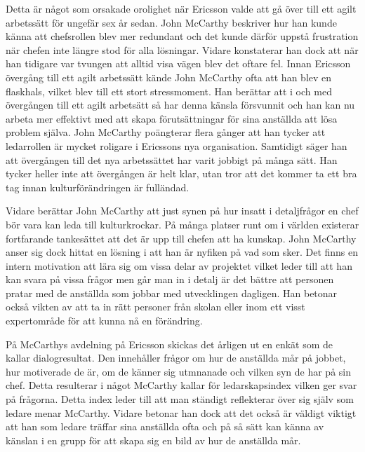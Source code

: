 Detta är något som orsakade orolighet när Ericsson valde att gå över till ett agilt arbetssätt för ungefär sex år sedan. John McCarthy beskriver hur han kunde känna att chefsrollen blev mer redundant och det kunde därför uppstå frustration när chefen inte längre stod för alla lösningar. Vidare konstaterar han dock att när han tidigare var tvungen att alltid visa vägen blev det oftare fel. Innan Ericsson övergång till ett agilt arbetssätt kände John McCarthy ofta att han blev en flaskhals, vilket blev till ett stort stressmoment. Han berättar att i och med övergången till ett agilt arbetsätt så har denna känsla försvunnit och han kan nu arbeta mer effektivt med att skapa förutsättningar för sina anställda att lösa problem själva. John McCarthy poängterar flera gånger att han tycker att ledarrollen är mycket roligare i Ericssons nya organisation. Samtidigt säger han att övergången till det nya arbetssättet har varit jobbigt på många sätt. Han tycker heller inte att övergången är helt klar, utan tror att det kommer ta ett bra tag innan kulturförändringen är fulländad.

Vidare berättar John McCarthy att just synen på hur insatt i detaljfrågor en chef bör vara kan leda till kulturkrockar. På många platser runt om i världen existerar fortfarande tankesättet att det är upp till chefen att ha kunskap. John McCarthy anser sig dock hittat en lösning i att han är nyfiken på vad som sker. Det finns en intern motivation att lära sig om vissa delar av projektet vilket leder till att han kan svara på vissa frågor men går man in i detalj är det bättre att personen pratar med de anställda som jobbar med utvecklingen dagligen. Han betonar också vikten av att ta in rätt personer från skolan eller inom ett visst expertområde för att kunna nå en förändring.

På McCarthys avdelning på Ericsson skickas det årligen ut en enkät som de kallar dialogresultat. Den innehåller frågor om hur de anställda mår på jobbet, hur motiverade de är, om de känner sig utmnanade och vilken syn de har på sin chef. Detta resulterar i något McCarthy kallar för ledarskapsindex vilken ger svar på frågorna. Detta index leder till att man ständigt reflekterar över sig själv som ledare menar McCarthy. Vidare betonar han dock att det också är väldigt viktigt att han som ledare träffar sina anställda ofta och på så sätt kan känna av känslan i en grupp för att skapa sig en bild av hur de anställda mår.